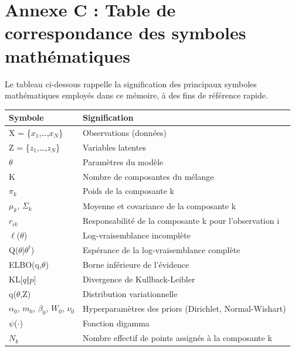 \section*{Annexe C : Table de correspondance des symboles mathématiques}
Le tableau ci-dessous rappelle la signification des principaux symboles mathématiques employés dans ce mémoire, à des fins de référence rapide.

\begin{table}[H]
\centering
\small
\setlength{\tabcolsep}{0.14cm}
\begin{tabular}{|p{7.42cm}|p{7.42cm}|}
\hline
\textbf{Symbole} & \textbf{Signification} \\
\hline
X = \{$x_{1}$,\ldots{},$x_{N}$\} & Observations (données) \\
\hline
Z = \{$z_{1}$,\ldots{},$z_{N}$\} & Variables latentes \\
\hline
$\theta $ & Paramètres du modèle \\
\hline
K & Nombre de composantes du mélange \\
\hline
$\pi _{k}$ & Poids de la composante k \\
\hline
$\mu _{k}$, $\Sigma _{k}$ & Moyenne et covariance de la composante k \\
\hline
$r_{ik}$ & Responsabilité de la composante k pour l'observation i \\
\hline
$\ell $($\theta $) & Log-vraisemblance incomplète \\
\hline
Q($\theta $|$\theta ^{t}$) & Espérance de la log-vraisemblance complète \\
\hline
ELBO(q,$\theta $) & Borne inférieure de l'évidence \\
\hline
KL[$q\Vert p$] & Divergence de Kullback-Leibler \\
\hline
q($\theta $,Z) & Distribution variationnelle \\
\hline
$\alpha _{0}$, $m_{0}$, $\beta _{0}$, $W_{0}$, $\nu _{0}$ & Hyperparamètres des priors (Dirichlet, Normal-Wishart) \\
\hline
$\psi $($\cdot $) & Fonction digamma \\
\hline
$N_{k}$ & Nombre effectif de points assignés à la composante k \\
\hline
\end{tabular}
\end{table}
